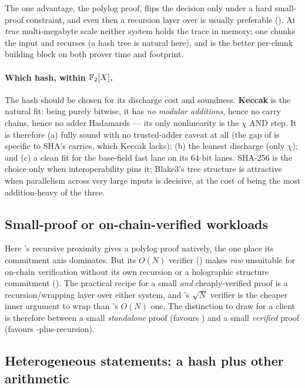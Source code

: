 The one \binius{} advantage, the polylog proof, flips the decision only
under a hard small-proof constraint, and even then a recursion layer over
\zinc{} is usually preferable (). At \emph{true}
multi-megabyte scale neither system holds the trace in memory; one chunks
the input and recurses (a hash tree is natural here), and \zinc{} is the
better per-chunk building block on both prover time and footprint.

\paragraph{Which hash, within $\mathbb{F}_2[X]$.} The hash should be chosen for
its discharge cost and soundness. \textbf{Keccak} is the natural fit:
being purely bitwise, it has \emph{no modular additions}, hence no carry
chains, hence no adder Hadamards --- its only nonlinearity is the $\chi$
AND step. It is therefore (a) fully sound with no trusted-adder caveat
at all (the gap of  is specific to SHA's carries,
which Keccak lacks); (b) the leanest discharge (only $\chi$); and (c) a
clean fit for the base-field fast lane on its $64$-bit lanes. SHA-256 is
the choice only when interoperability pins it; Blake3's tree structure is
attractive when parallelism across very large inputs is decisive, at the
cost of being the most addition-heavy of the three.

\subsection{Small-proof or on-chain-verified workloads}
\label{sec:guid-proof}

Here \binius{}'s recursive proximity gives a polylog proof natively,
the one place its commitment axis dominates. But its $O(N)$ verifier
() makes \emph{raw} \binius{} unsuitable for
on-chain verification without its own recursion or a holographic
structure commitment (). The practical recipe for a
small \emph{and} cheaply-verified proof is a recursion/wrapping layer
over either system, and \zinc{}'s $\sqrt N$ verifier is the cheaper inner
argument to wrap than \binius{}'s $O(N)$ one. The distinction to draw for
a client is therefore between a small \emph{standalone} proof (favours
\binius{}) and a small \emph{verified} proof (favours
\zinc{}-plus-recursion).

\subsection{Heterogeneous statements: a hash plus other arithmetic}
\label{sec:guid-hetero}

